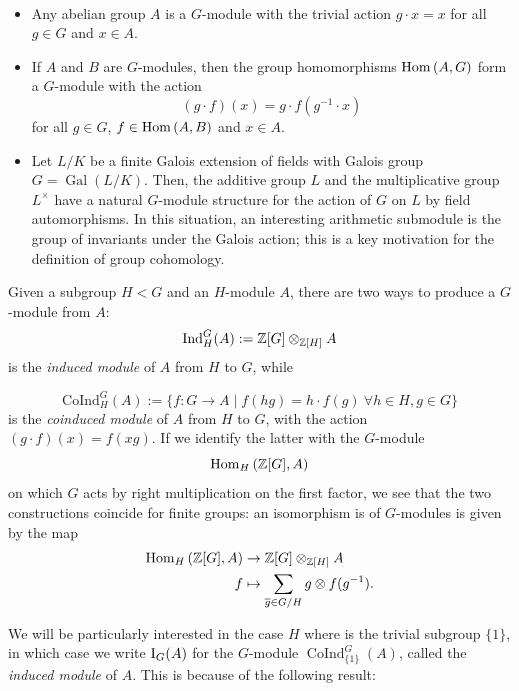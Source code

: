 \documentclass[a4paper, oneside]{memoir}
\begin{document}
\begin{example}[$G$-modules]\
    \begin{itemize}
        \item Any abelian group $A$ is a $G$-module with the trivial action $g\cdot x=x$ for all $g\in G$ and $x\in A$.
        \item If $A$ and $B$ are $G$-modules, then the group homomorphisms $\operatorname{Hom}{(A,G)}$ form a $G$-module with the action
              \[
                  (g\cdot f)(x)=g\cdot f(g^{-1}\cdot x)
              \]
              for all $g\in G$, $f\in\operatorname{Hom}{(A,B)}$ and $x\in A$.
        \item Let $L / K$ be a finite Galois extension of fields with Galois group $G=\operatorname{Gal}{(L / K)}$. Then, the additive group $L$ and the multiplicative group $L^\times$ have a natural $G$-module structure for the action of $G$ on $L$ by field automorphisms. In this situation, an interesting arithmetic submodule is the group of invariants under the Galois action; this is a key motivation for the definition of group cohomology.
    \end{itemize}
\end{example}


Given a subgroup $H<G$ and an $H$-module $A$, there are two ways to produce a $G$-module from $A$:
\[
    \mathrm{Ind}^G_H{(A)}:=\mathbb{Z}[G]\otimes_{\mathbb{Z}[H]}{A}
\]
is the \textit{induced module} of $A$ from $H$ to $G$, while

\[
    \mathrm{CoInd}^G_H{(A)}:=\{f:G\to A \mid f(hg)=h\cdot f(g) ~\forall h\in H, g\in G\}
\]
is the \textit{coinduced module} of $A$ from $H$ to $G$, with the action $(g \cdot f)(x)=f(xg)$. If we identify the latter with the $G$-module
\[
    \operatorname{Hom}_H{(\mathbb{Z}[G],A)}
\]
on which $G$ acts by right multiplication on the first factor, we see that the two constructions coincide for finite groups: an isomorphism is of $G$-modules is given by the map
\begin{align}
    \operatorname{Hom}_H{(\mathbb{Z}[G],A)} & \to \mathbb{Z}[G]\otimes_{\mathbb{Z}[H]}{A}                                \nonumber       \\
    f                 & \mapsto \sum_{\overline{g} \in G / H}{g\otimes f(g^{-1})}\label{eq:IndIso}.
\end{align}

We will be particularly interested in the case $H$ where is the trivial subgroup $\{1\}$, in which case we write $\mathrm{I}_{G}(A)$ for the $G$-module $\operatorname{CoInd}^G_{\{1\}}{(A)}$, called the \textit{induced module} of $A$. This is because of the following result:
\end{document}
